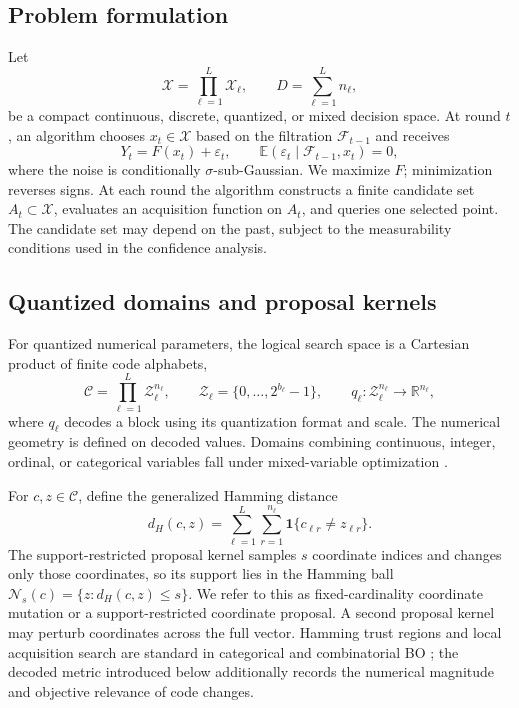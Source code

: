 \documentclass[11pt]{article}
\theoremstyle{definition}
\theoremstyle{remark}
\newcommand{\X}{\mathcal X}
\newcommand{\R}{\mathbb R}
\newcommand{\E}{\mathbb E}
\newcommand{\1}{\mathbf 1}
\begin{document}
\subsection{Problem formulation}\label{sec:problem}

Let
\[
  \X=\prod_{\ell=1}^{L}\X_\ell,
  \qquad D=\sum_{\ell=1}^{L}n_\ell,
\]
be a compact continuous, discrete, quantized, or mixed decision space.  At round $t$, an algorithm chooses
$x_t\in\X$ based on the filtration $\mathcal F_{t-1}$ and receives
\begin{equation}\label{eq:oracle}
  Y_t=F(x_t)+\varepsilon_t,
  \qquad
  \E(\varepsilon_t\mid\mathcal F_{t-1},x_t)=0,
\end{equation}
where the noise is conditionally $\sigma$-sub-Gaussian.  We maximize $F$; minimization reverses
signs.  At each round the algorithm constructs a finite candidate set $A_t\subset\X$, evaluates an
acquisition function on $A_t$, and queries one selected point.  The candidate set may depend on the
past, subject to the measurability conditions used in the confidence analysis.

\subsection{Quantized domains and proposal kernels}\label{sec:proposal-domain}

For quantized numerical parameters, the logical search space is a Cartesian product of finite code
alphabets,
\begin{equation}\label{eq:quantized-domain}
  \mathcal C=\prod_{\ell=1}^{L}\mathcal Z_\ell^{n_\ell},
  \qquad \mathcal Z_\ell=\{0,\ldots,2^{b_\ell}-1\},
  \qquad q_\ell:\mathcal Z_\ell^{n_\ell}\to\R^{n_\ell},
\end{equation}
where $q_\ell$ decodes a block using its quantization format and scale.  The numerical geometry is
defined on decoded values.  Domains combining continuous, integer, ordinal, or categorical
variables fall under mixed-variable optimization \cite{MiVaBo,Casmopolitan}.

For $c,z\in\mathcal C$, define the generalized Hamming distance
\begin{equation}\label{eq:hamming-support}
  d_H(c,z)=\sum_{\ell=1}^{L}\sum_{r=1}^{n_\ell}
  \mathbf 1\{c_{\ell r}\ne z_{\ell r}\}.
\end{equation}
The support-restricted proposal kernel samples $s$ coordinate indices and changes only those
coordinates, so its support lies in the Hamming ball
$\mathcal N_s(c)=\{z:d_H(c,z)\le s\}$.  We refer to this as fixed-cardinality coordinate mutation
or a support-restricted coordinate proposal.  A second proposal kernel may perturb coordinates
across the full vector.  Hamming trust regions and local acquisition search are standard in
categorical and combinatorial BO \cite{Casmopolitan,COMBO}; the decoded metric introduced below
additionally records the numerical magnitude and objective relevance of code changes.
\end{document}

